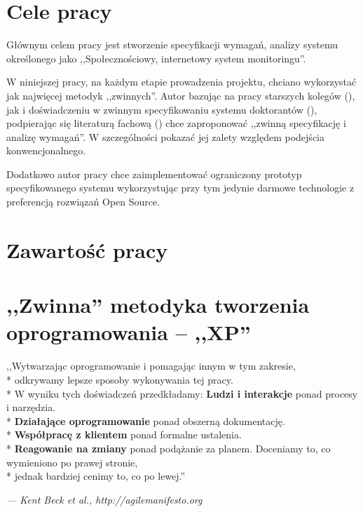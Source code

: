 \newpage

\section{Cele pracy}
\label{sec:celePracy}

Głównym celem pracy jest stworzenie specyfikacji wymagań, analizy systemu określonego jako ,,Społecznościowy, internetowy system monitoringu''.

W niniejszej pracy, na każdym etapie prowadzenia projektu, chciano wykorzystać jak najwięcej metodyk ,,zwinnych''. Autor bazując na pracy starszych kolegów (\cite{JakMich06}), jak i doświadczeniu w zwinnym specyfikowaniu systemu doktorantów (\cite{Mad09}), podpierając się literaturą fachową (\cite{Bec99}) chce zaproponować ,,zwinną specyfikację i analizę wymagań''. W szczególności pokazać jej zalety względem podejścia konwencjonalnego.

Dodatkowo autor pracy chce zaimplementować ograniczony prototyp specyfikowanego systemu wykorzystując przy tym jedynie darmowe technologie z preferencją rozwiązań Open Source.

\section{Zawartość pracy}
\label{sec:zawartoscPracy}

\todo

\newpage

\section{,,Zwinna'' metodyka tworzenia oprogramowania -- ,,XP''}
\label{sec:ZMTO}

\begin{center}
    ,,Wytwarzając oprogramowanie i pomagając innym w tym zakresie,\\*
    odkrywamy lepsze sposoby wykonywania tej pracy.\\*
    W wyniku tych doświadczeń przedkładamy:\newline
    \newline
    \textbf{Ludzi i interakcje} ponad procesy i narzędzia.\\*
    \textbf{Działające oprogramowanie} ponad obszerną dokumentację.\\*
    \textbf{Współpracę z klientem} ponad formalne ustalenia.\\*
    \textbf{Reagowanie na zmiany} ponad podążanie za planem.\newline
    \newline
    Doceniamy to, co wymieniono po prawej stronie,\\*
    jednak bardziej cenimy to, co po lewej.''
\end{center}
\hfill \begin{small}\textit{--- Kent Beck et al., http://agilemanifesto.org}\end{small}

